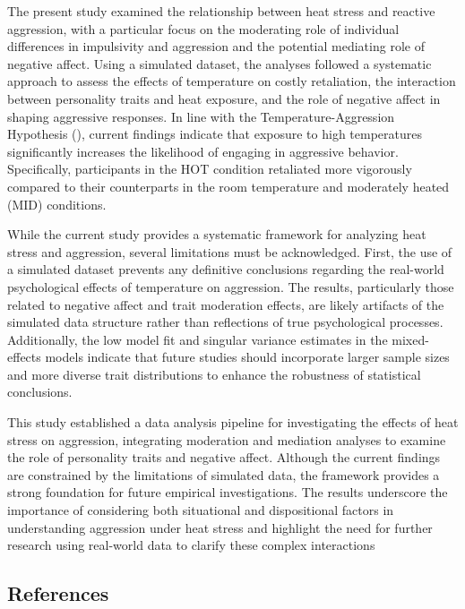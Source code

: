 \documentclass[
  man,
  floatsintext,
  longtable,
  nolmodern,
  notxfonts,
  notimes,
  colorlinks=true,linkcolor=blue,citecolor=blue,urlcolor=blue]{apa7}
\begin{document}
The present study examined the relationship between heat stress and
reactive aggression, with a particular focus on the moderating role of
individual differences in impulsivity and aggression and the potential
mediating role of negative affect. Using a simulated dataset, the
analyses followed a systematic approach to assess the effects of
temperature on costly retaliation, the interaction between personality
traits and heat exposure, and the role of negative affect in shaping
aggressive responses. In line with the Temperature-Aggression Hypothesis
(), current findings indicate that exposure to high temperatures
significantly increases the likelihood of engaging in aggressive
behavior. Specifically, participants in the HOT condition retaliated
more vigorously compared to their counterparts in the room temperature
and moderately heated (MID) conditions.

While the current study provides a systematic framework for analyzing
heat stress and aggression, several limitations must be acknowledged.
First, the use of a simulated dataset prevents any definitive
conclusions regarding the real-world psychological effects of
temperature on aggression. The results, particularly those related to
negative affect and trait moderation effects, are likely artifacts of
the simulated data structure rather than reflections of true
psychological processes. Additionally, the low model fit and singular
variance estimates in the mixed-effects models indicate that future
studies should incorporate larger sample sizes and more diverse trait
distributions to enhance the robustness of statistical conclusions.

This study established a data analysis pipeline for investigating the
effects of heat stress on aggression, integrating moderation and
mediation analyses to examine the role of personality traits and
negative affect. Although the current findings are constrained by the
limitations of simulated data, the framework provides a strong
foundation for future empirical investigations. The results underscore
the importance of considering both situational and dispositional factors
in understanding aggression under heat stress and highlight the need for
further research using real-world data to clarify these complex
interactions

\clearpage

\subsection{References}\label{references}
\end{document}
